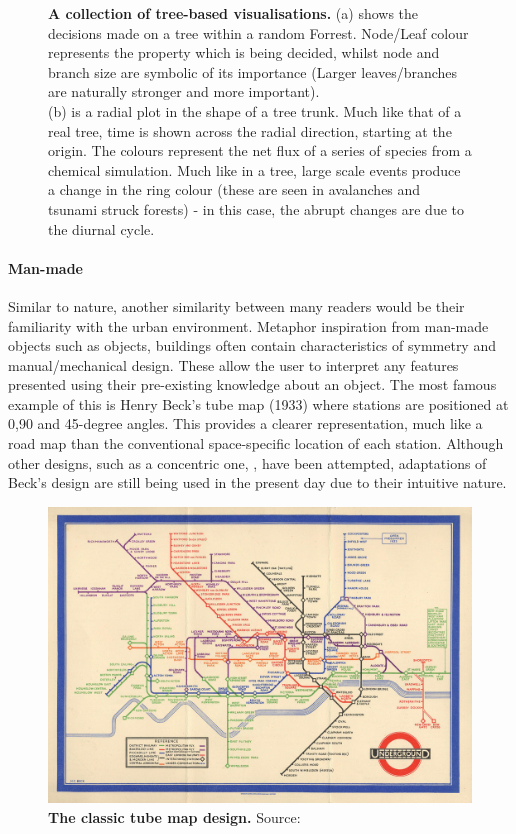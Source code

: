 \begin{figure}[H]
    
        \caption{\textbf{A collection of tree-based visualisations.}
         (a) shows the decisions made on a tree within a random Forrest. Node/Leaf colour represents the property which is being decided, whilst node and branch size are symbolic of its importance (Larger leaves/branches are naturally stronger and more important).\\
          (b) is a radial plot in the shape of a tree trunk. Much like that of a real tree, time is shown across the radial direction, starting at the origin. The colours represent the net flux of a series of species from a chemical simulation. Much like in a tree, large scale events produce a change in the ring colour (these are seen in avalanches and tsunami struck forests) - in this case, the abrupt changes are due to the diurnal cycle.}
        \label{fig:trees}
\end{figure}


\paragraph*{Man-made}
Similar to nature, another similarity between many readers would be their familiarity with the urban environment. Metaphor inspiration from man-made objects such as objects, buildings often contain characteristics of symmetry and manual/mechanical design. These allow the user to interpret any features presented using their pre-existing knowledge about an object. The most famous example of this is Henry Beck's tube map (1933) \citep{beck} where stations are positioned at 0,90 and 45-degree angles. This provides a clearer representation, much like a road map than the conventional space-specific location of each station. Although other designs, such as a concentric one, \citep{circ}, have been attempted, adaptations of Beck's design are still being used in the present day due to their intuitive nature. 
% 
% 
%

\begin{figure}[H]
     \centering

         \includegraphics[width=.495\textwidth]{figures_c1/Beck_Map_1933.jpg}
         \vspace{5mm}
         
         \caption{\textbf{The classic tube map design.} Source: \citep{beck}}
         
         \label{fig:beck}

\end{figure}

